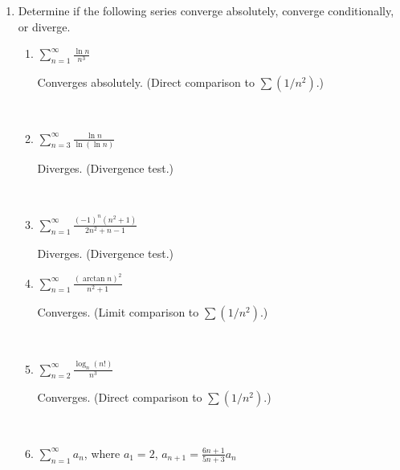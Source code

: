 \documentclass[]{handout}
\begin{document}
\begin{enumerate}[(1)]
\begin{enumerate}



	\end{enumerate}


	\item Determine if the following series converge absolutely, converge conditionally,
		or diverge.

	\begin{enumerate}

		\item $\displaystyle \sum_{n=1}^\infty \frac{\ln n}{n^3}$

\begin{answer} 
		Converges absolutely.  (Direct comparison to $\sum (1/n^2)$.)
\end{answer}

		\

		\item $\displaystyle \sum_{n=3}^\infty \frac{\ln n}{\ln(\ln n)}$

\begin{answer} Diverges.  (Divergence test.)
\end{answer}

		\

		\item $\displaystyle \sum_{n=1}^\infty \frac{(-1)^n(n^2 + 1)}{2n^2 + n - 1}$

\begin{answer} 
		Diverges.  (Divergence test.)
\end{answer}

		\item $\displaystyle \sum_{n=1}^\infty \frac{(\arctan n)^2}{n^2 + 1}$

\begin{answer} 
		Converges.  (Limit comparison to $\sum(1/n^2)$.)
\end{answer}

		\

		\item $\displaystyle \sum_{n=2}^\infty \frac{\log_n(n!)}{n^3}$

\begin{answer} 
		Converges.  (Direct comparison to $\sum(1/n^2)$.)
\end{answer}

		\

		\item $\displaystyle\sum_{n=1}^\infty a_n$, where $a_1=2$, $a_{n+1}=\frac{6n+1}{5n+3}a_n$ %


\end{enumerate}
\end{enumerate}
\end{document}
